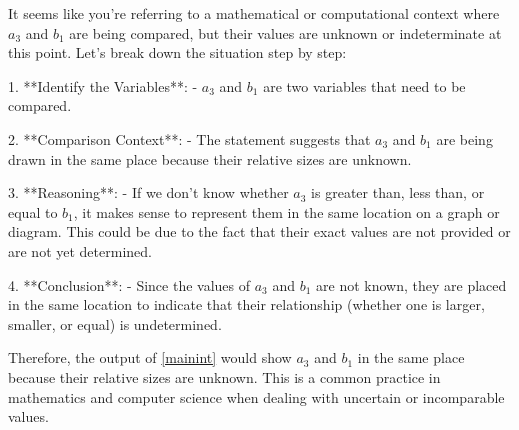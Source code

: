 It seems like you're referring to a mathematical or computational context where \(a_3\) and \(b_1\) are being compared, but their values are unknown or indeterminate at this point. Let's break down the situation step by step:

1. **Identify the Variables**: 
   - \(a_3\) and \(b_1\) are two variables that need to be compared.
   
2. **Comparison Context**:
   - The statement suggests that \(a_3\) and \(b_1\) are being drawn in the same place because their relative sizes are unknown.

3. **Reasoning**:
   - If we don't know whether \(a_3\) is greater than, less than, or equal to \(b_1\), it makes sense to represent them in the same location on a graph or diagram. This could be due to the fact that their exact values are not provided or are not yet determined.

4. **Conclusion**:
   - Since the values of \(a_3\) and \(b_1\) are not known, they are placed in the same location to indicate that their relationship (whether one is larger, smaller, or equal) is undetermined.

Therefore, the output of \ref{mainint} would show \(a_3\) and \(b_1\) in the same place because their relative sizes are unknown. This is a common practice in mathematics and computer science when dealing with uncertain or incomparable values.